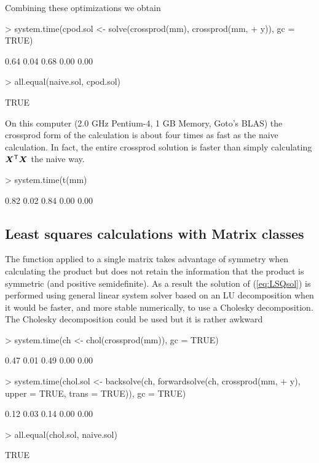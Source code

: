 \documentclass{article}
\begin{document}
Combining these optimizations we obtain
\begin{Schunk}
\begin{Sinput}
> system.time(cpod.sol <- solve(crossprod(mm), crossprod(mm, 
+     y)), gc = TRUE)
\end{Sinput}
\begin{Soutput}
[1] 0.64 0.04 0.68 0.00 0.00
\end{Soutput}
\begin{Sinput}
> all.equal(naive.sol, cpod.sol)
\end{Sinput}
\begin{Soutput}
[1] TRUE
\end{Soutput}
\end{Schunk}

On this computer (2.0 GHz Pentium-4, 1 GB Memory, Goto's BLAS) the
crossprod form of the calculation is about four times as fast as the
naive calculation.  In fact, the entire crossprod solution is
faster than simply calculating $\bm{X}^\mathsf{T}\bm{X}$ the naive way.
\begin{Schunk}
\begin{Sinput}
> system.time(t(mm) %*% mm, gc = TRUE)
\end{Sinput}
\begin{Soutput}
[1] 0.82 0.02 0.84 0.00 0.00
\end{Soutput}
\end{Schunk}

\subsection{Least squares calculations with Matrix classes}
\label{sec:MatrixLSQ}

The  function applied to a single matrix takes
advantage of symmetry when calculating the product but does not retain
the information that the product is symmetric (and positive
semidefinite).  As a result the solution of (\ref{eq:LSQsol}) is
performed using general linear system solver based on an LU
decomposition when it would be faster, and more stable numerically, to
use a Cholesky decomposition.  The Cholesky decomposition could be used
but it is rather awkward
\begin{Schunk}
\begin{Sinput}
> system.time(ch <- chol(crossprod(mm)), gc = TRUE)
\end{Sinput}
\begin{Soutput}
[1] 0.47 0.01 0.49 0.00 0.00
\end{Soutput}
\begin{Sinput}
> system.time(chol.sol <- backsolve(ch, forwardsolve(ch, crossprod(mm, 
+     y), upper = TRUE, trans = TRUE)), gc = TRUE)
\end{Sinput}
\begin{Soutput}
[1] 0.12 0.03 0.14 0.00 0.00
\end{Soutput}
\begin{Sinput}
> all.equal(chol.sol, naive.sol)
\end{Sinput}
\begin{Soutput}
[1] TRUE
\end{Soutput}
\end{Schunk}
\end{document}
